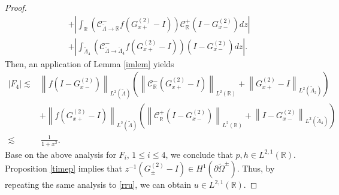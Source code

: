 \documentclass[10pt,a4paper]{amsart}
\begin{document}
\begin{proof}
\begin{equation*}
\begin{aligned}
&+\left|\int_{\mathbb{R}}\left(\mathcal{C}_{\widetilde{\Lambda}\rightarrow\mathbb{R}}^{-}f\left(G^{(2)}_{x+}-I\right)\right)\mathcal{C}_{\mathbb{R}}^{+}\left(I-G^{(2)}_{x-}\right)dz\right|\\
&+\left|\int_{\widetilde{\Lambda}_{4}}\left(\mathcal{C}_{\widetilde{\Lambda}\rightarrow\widetilde{\Lambda}_{4}}^{-}f\left(G^{(2)}_{x+}-I\right)\right)\left(I-G^{(2)}_{x-}\right)dz\right|.
\end{aligned}
\end{equation*}
Then, an application of Lemma \ref{imlem} yields
\begin{equation*}
\begin{aligned}
\left|F_{4}\right|
\lesssim&\left\|f\left(I-G^{(2)}_{x-}\right)\right\|_{L^{2}(\widetilde{\Lambda})}\left(\left\|\mathcal{C}_{\mathbb{R}}^{-}\left(G^{(2)}_{x+}-I\right)\right\|_{L^{2}(\mathbb{R})}+\left\|G^{(2)}_{x+}-I\right\|_{L^{2}(\widetilde{\Lambda}_{2})}\right)\\
&+\left\|f\left(G^{(2)}_{x+}-I\right)\right\|_{L^{2}(\widetilde{\Lambda})}\left(\left\|\mathcal{C}_{\mathbb{R}}^{+}\left(I-G^{(2)}_{x-}\right)\right\|_{L^{2}(\mathbb{R})}+\left\|I-G^{(2)}_{x-}\right\|_{L^{2}(\widetilde{\Lambda}_{4})}\right)\\
\lesssim&\,\frac{1}{1+x^{2}}.
\end{aligned}
\end{equation*}
Base on the above analysis for $F_{i}$, $1\leq i\leq4$, we conclude that $p,h\in L^{2,1}(\mathbb{R})$. Proposition \ref{timep} implies that $z^{-1}(G^{(2)}_{\pm}-I )\in H^{1}(\partial\widetilde{\Omega}^{\pm})$. Thus, by repeating the same analysis to \eqref{rru}, we can obtain $u\in L^{2,1}(\mathbb{R})$.



\end{proof}
\end{document}

